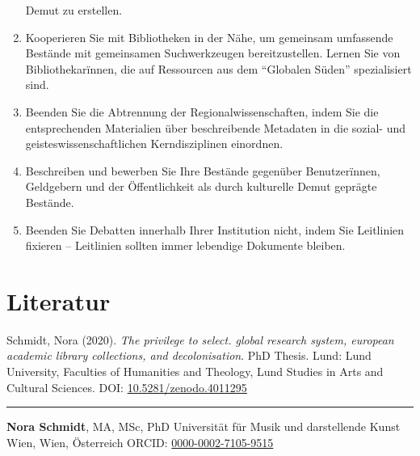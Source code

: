 \documentclass[a4paper,
fontsize=11pt,
oneside,
numbers=noperiodatend,
parskip=half-,
bibliography=totoc,
final
]{scrartcl}
\begin{document}
\begin{enumerate}
  Demut zu erstellen.
\item
  Kooperieren Sie mit Bibliotheken in der Nähe, um gemeinsam umfassende
  Bestände mit gemeinsamen Suchwerkzeugen bereitzustellen. Lernen Sie
  von Bibliothekarïnnen, die auf Ressourcen aus dem \enquote{Globalen
  Süden} spezialisiert sind.
\item
  Beenden Sie die Abtrennung der Regionalwissenschaften, indem Sie die
  entsprechenden Materialien über beschreibende Metadaten in die sozial-
  und geisteswissenschaftlichen Kerndisziplinen einordnen.
\item
  Beschreiben und bewerben Sie Ihre Bestände gegenüber Benutzerïnnen,
  Geldgebern und der Öffentlichkeit als durch kulturelle Demut geprägte
  Bestände.
\item
  Beenden Sie Debatten innerhalb Ihrer Institution nicht, indem Sie
  Leitlinien fixieren -- Leitlinien sollten immer lebendige Dokumente
  bleiben.
\end{enumerate}

\section{Literatur}

Schmidt, Nora (2020). \textit{The privilege to select. global research system, european academic library collections, and decolonisation}. PhD Thesis. Lund: Lund University, Faculties of Humanities and Theology, Lund Studies in Arts and Cultural Sciences. DOI: \href{https://doi.org/10.5281/zenodo.4011295}{10.5281/zenodo.4011295}

\begin{center}\rule{0.5\linewidth}{0.5pt}\end{center}

\textbf{Nora Schmidt}, MA, MSc, PhD \textbar{} Universität für Musik
und darstellende Kunst Wien, Wien, Österreich \textbar ORCID:
\href{https://orcid.org/0000-0002-7105-9515}{0000-0002-7105-9515}
\end{document}
